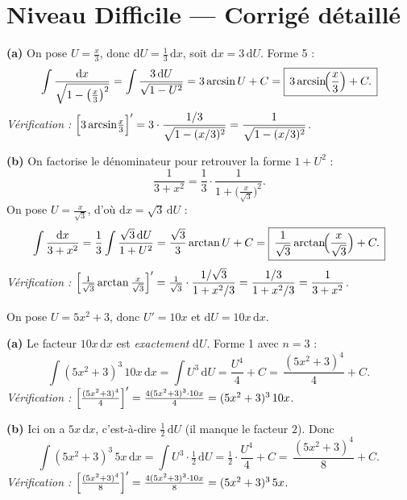 \documentclass[11pt,a4paper]{article}
\newcommand{\dd}{\mathrm{d}}
\begin{document}
\section*{Niveau Difficile — Corrigé détaillé}

\begin{corr}
\textbf{(a)} On pose $U=\tfrac{x}{3}$, donc $\dd U=\tfrac13\,\dd x$, soit $\dd x=3\,\dd U$. Forme 5 :
\[
\int \frac{\dd x}{\sqrt{1-\bigl(\tfrac{x}{3}\bigr)^2}}
=\int \frac{3\,\dd U}{\sqrt{1-U^2}}=3\arcsin U+C
=\boxed{\,3\arcsin\!\Bigl(\frac{x}{3}\Bigr)+C.\,}
\]
\emph{Vérification :} $\Bigl[3\arcsin\!\tfrac{x}{3}\Bigr]'=3\cdot\dfrac{1/3}{\sqrt{1-(x/3)^2}}=\dfrac{1}{\sqrt{1-(x/3)^2}}$. \checkmark

\medskip
\textbf{(b)} On factorise le dénominateur pour retrouver la forme $1+U^2$ :
\[
\frac{1}{3+x^2}=\frac{1}{3}\cdot\frac{1}{1+\bigl(\tfrac{x}{\sqrt3}\bigr)^2}.
\]
On pose $U=\tfrac{x}{\sqrt3}$, d'où $\dd x=\sqrt3\,\dd U$ :
\[
\int \frac{\dd x}{3+x^2}=\frac13\int\frac{\sqrt3\,\dd U}{1+U^2}
=\frac{\sqrt3}{3}\arctan U+C
=\boxed{\,\frac{1}{\sqrt3}\arctan\!\Bigl(\frac{x}{\sqrt3}\Bigr)+C.\,}
\]
\emph{Vérification :} $\Bigl[\tfrac{1}{\sqrt3}\arctan\tfrac{x}{\sqrt3}\Bigr]'
=\tfrac{1}{\sqrt3}\cdot\dfrac{1/\sqrt3}{1+x^2/3}=\dfrac{1/3}{1+x^2/3}=\dfrac{1}{3+x^2}$. \checkmark
\end{corr}

\begin{corr}
On pose $U=5x^2+3$, donc $U'=10x$ et $\dd U=10x\,\dd x$.

\medskip
\textbf{(a)} Le facteur $10x\,\dd x$ est \emph{exactement} $\dd U$. Forme 1 avec $n=3$ :
\[
\int (5x^2+3)^3\,10x\,\dd x=\int U^3\,\dd U=\frac{U^4}{4}+C=\boxed{\,\frac{(5x^2+3)^4}{4}+C.\,}
\]
\emph{Vérification :} $\Bigl[\tfrac{(5x^2+3)^4}{4}\Bigr]'=\tfrac{4(5x^2+3)^3\cdot 10x}{4}=(5x^2+3)^3\,10x$. \checkmark

\medskip
\textbf{(b)} Ici on a $5x\,\dd x$, c'est-à-dire $\tfrac12\,\dd U$ (il manque le facteur $2$). Donc
\[
\int (5x^2+3)^3\,5x\,\dd x=\int U^3\cdot\tfrac12\,\dd U=\tfrac12\cdot\frac{U^4}{4}+C
=\boxed{\,\frac{(5x^2+3)^4}{8}+C.\,}
\]
\emph{Vérification :} $\Bigl[\tfrac{(5x^2+3)^4}{8}\Bigr]'=\tfrac{4(5x^2+3)^3\cdot 10x}{8}=(5x^2+3)^3\,5x$. \checkmark
\end{corr}
\end{document}
